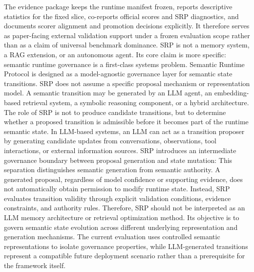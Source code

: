 {}The evidence package keeps the runtime manifest frozen, reports descriptive statistics for the fixed slice, co-reports official scores and SRP diagnostics, and documents scorer alignment and promotion decisions explicitly. It therefore serves as paper-facing external validation support under a frozen evaluation scope rather than as a claim of universal benchmark dominance.\markdownRendererInterblockSeparator
{}
\markdownRendererSectionEnd 
\markdownRendererSectionEnd \markdownRendererSectionBegin
{}\markdownRendererInterblockSeparator
{}SRP is not a memory system, a RAG extension, or an autonomous agent. Its core claim is more specific: semantic runtime governance is a first-class systems problem.\markdownRendererInterblockSeparator
{}\markdownRendererSectionBegin
{}\markdownRendererInterblockSeparator
{}Semantic Runtime Protocol is designed as a model-agnostic governance layer for semantic state transitions. SRP does not assume a specific proposal mechanism or representation model. A semantic transition may be generated by an LLM agent, an embedding-based retrieval system, a symbolic reasoning component, or a hybrid architecture. The role of SRP is not to produce candidate transitions, but to determine whether a proposed transition is admissible before it becomes part of the runtime semantic state.\markdownRendererParagraphSeparator
{}In LLM-based systems, an LLM can act as a transition proposer by generating candidate updates from conversations, observations, tool interactions, or external information sources. SRP introduces an intermediate governance boundary between proposal generation and state mutation:\markdownRendererInterblockSeparator
{}\markdownRendererInterblockSeparator
{}This separation distinguishes semantic generation from semantic authority. A generated proposal, regardless of model confidence or supporting evidence, does not automatically obtain permission to modify runtime state. Instead, SRP evaluates transition validity through explicit validation conditions, evidence constraints, and authority rules.\markdownRendererParagraphSeparator
{}Therefore, SRP should not be interpreted as an LLM memory architecture or retrieval optimization method. Its objective is to govern semantic state evolution across different underlying representation and generation mechanisms. The current evaluation uses controlled semantic representations to isolate governance properties, while LLM-generated transitions represent a compatible future deployment scenario rather than a prerequisite for the framework itself.\markdownRendererParagraphSeparator
